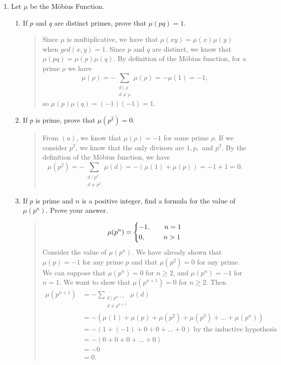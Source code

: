 \documentclass{hw}
\begin{document}
\begin{enumerate}
\newpage
\item Let $\mu$ be the M\"{o}bius Function.
\begin{enumerate}
\item If $p$ and $q$ are distinct primes, prove that $\mu(pq)=1$.
\begin{quote}
Since $\mu$ is multiplicative, we have that $\mu(xy)=\mu(x)\mu(y)$ when $gcd(x,y)=1$. Since $p$ and
$q$ are distinct, we know that $\mu(pq)=\mu(p)\mu(q)$. By definition of the M\"{o}bius function, for
a prime $\rho$ we have
\[
\mu(\rho)=-\sum_{\substack{d\mid \rho\\d\neq\rho}}\mu(\rho)=-\mu(1)=-1,
\]
so $\mu(p)\mu(q)=(-1)(-1)=1$.
\end{quote}
\item If $p$ is prime, prove that $\mu(p^{2})=0$.
\begin{quote}
From $(a)$, we know that $\mu(\rho)=-1$ for some prime $\rho$. If we consider $p^2$, we know that the
only divisors are $1,p,$ and $p^2$. By the definition of the M\"{o}bius function, we have
\[
\mu(p^2)=-\sum_{\substack{d\mid p^2\\d\neq p^2}}\mu(d)=-(\mu(1) + \mu(p))=-1 +1 = 0.
\]
\end{quote}
\item If $p$ is prime and $n$ is a positive integer, find a formula for the value of $\mu(p^{n})$.
Prove your answer.
\begin{quote}
\[
\mu(p^n)=
\begin{dcases*}
-1,\qquad n=1\\
0,\ \ \qquad n>1
\end{dcases*}
\]
Consider the value of $\mu(p^{n})$. We have already shown that $\mu(p)=-1$ for any prime $p$ and
that $\mu(p^2)=0$ for any prime. We can suppose that $\mu(p^{n})=0$ for $n\geq2$, and
$\mu(p^{n})=-1$ for $n=1$. We want to show that $\mu(p^{n+1})=0$ for $n\geq2$. Then
\begin{align*}
\mu(p^{n+1})&=-\sum_{\substack{d\mid p^{n+1}\\ d\neq p^{n+1}}}\mu(d)\\
&= -(\mu(1)+\mu(p)+\mu(p^{2})+\mu(p^{3})+\dots+\mu(p^{n}))\\
&= -(1+(-1)+0+0+\dots+0)\text{ by the inductive hypothesis}\\
&= -(0+0+0+\dots+0)\\
&= -0\\
&= 0.
\end{align*}
\end{quote}
\end{enumerate}

\end{enumerate}
\end{document}
